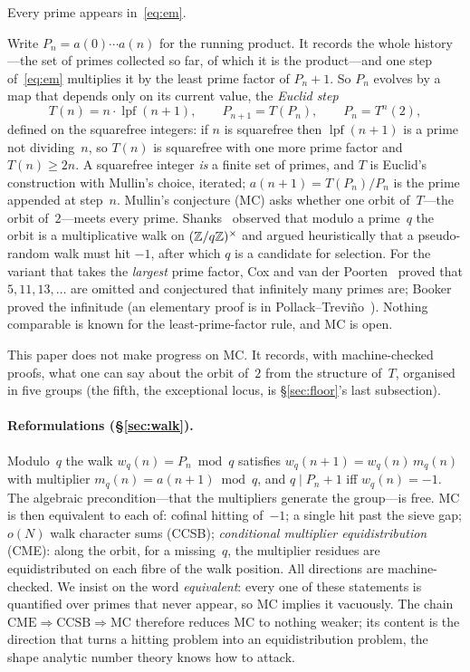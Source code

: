 \documentclass[10pt,a4paper]{article}
\providecommand{\CME}{\mathrm{CME}}
\providecommand{\CCSB}{\mathrm{CCSB}}
\newcommand{\lpf}{\operatorname{lpf}}
\begin{document}
\begin{conjecture}[Mullin 1963]\label{conj:mc}
Every prime appears in~\eqref{eq:em}.
\end{conjecture}

Write $P_n=a(0)\cdots a(n)$ for the running product.  It records the
whole history---the set of primes collected so far, of which it is the
product---and one step of~\eqref{eq:em} multiplies it by the least prime
factor of $P_n+1$.  So $P_n$ evolves by a map that depends only on its
current value, the \emph{Euclid step}
\[
  T(n)=n\cdot\lpf(n{+}1),\qquad P_{n+1}=T(P_n),\qquad P_n=T^{n}(2),
\]
defined on the squarefree integers: if $n$ is squarefree then $\lpf(n{+}1)$
is a prime not dividing~$n$, so $T(n)$ is squarefree with one more prime
factor and $T(n)\ge2n$.  A squarefree integer \emph{is} a finite set of
primes, and $T$ is Euclid's construction with Mullin's choice, iterated;
$a(n{+}1)=T(P_n)/P_n$ is the prime appended at step~$n$.  Mullin's
conjecture (MC) asks whether one orbit of~$T$---the orbit of~$2$---meets
every prime.  Shanks~\cite{Shanks1991} observed
that modulo a prime~$q$ the orbit is a multiplicative walk on
$(\mathbb{Z}/q\mathbb{Z})^\times$ and argued heuristically that a pseudo-random walk
must hit $-1$, after which $q$ is a candidate for selection.  For the
variant that takes the \emph{largest} prime factor, Cox and van der
Poorten~\cite{CoxVdP1968} proved that $5,11,13,\dots$ are omitted and
conjectured that infinitely many primes are; Booker~\cite{Booker2012}
proved the infinitude (an elementary proof is in
Pollack--Trevi\~no~\cite{PollackTrevino2014}).  Nothing comparable is known
for the least-prime-factor rule, and MC is open.

This paper does not make progress on MC.  It records, with machine-checked
proofs, what one can say about the orbit of~$2$ from the structure of~$T$,
organised in five groups (the fifth, the exceptional locus, is
\S\ref{sec:floor}'s last subsection).

\paragraph{Reformulations (\S\ref{sec:walk}).}  Modulo~$q$ the walk
$w_q(n)=P_n\bmod q$ satisfies $w_q(n{+}1)=w_q(n)\,m_q(n)$ with multiplier
$m_q(n)=a(n{+}1)\bmod q$, and $q\mid P_n+1$ iff $w_q(n)=-1$.  The
algebraic precondition---that the multipliers generate the group---is
free.  MC is then equivalent to each of: cofinal hitting of~$-1$; a
single hit past the sieve gap; $o(N)$ walk character sums (CCSB);
\emph{conditional multiplier equidistribution} (CME): along the orbit,
for a missing~$q$, the multiplier residues are equidistributed on each
fibre of the walk position.  All directions are machine-checked.  We
insist on the word \emph{equivalent}: every one of these statements is
quantified over primes that never appear, so MC implies it vacuously.
The chain $\CME\Rightarrow\CCSB\Rightarrow\mathrm{MC}$ therefore reduces
MC to nothing weaker; its content is the direction that turns a hitting
problem into an equidistribution problem, the shape analytic number
theory knows how to attack.
\end{document}
